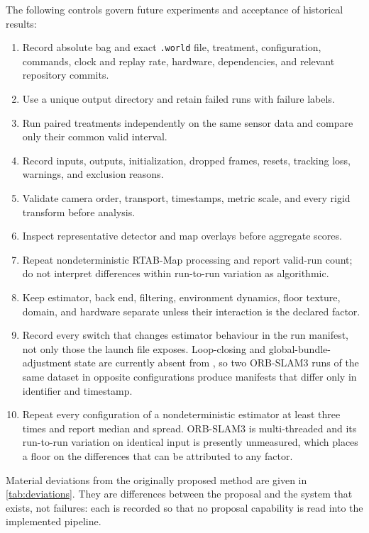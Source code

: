 The following controls govern future experiments and acceptance of historical
results:
\begin{enumerate}
  \item Record absolute bag and exact \texttt{.world} file, treatment,
    configuration, commands, clock and replay rate, hardware, dependencies, and
    relevant repository commits.
  \item Use a unique output directory and retain failed runs with failure labels.
  \item Run paired treatments independently on the same sensor data and compare
    only their common valid interval.
  \item Record inputs, outputs, initialization, dropped frames, resets, tracking
    loss, warnings, and exclusion reasons.
  \item Validate camera order, transport, timestamps, metric scale, and every
    rigid transform before analysis.
  \item Inspect representative detector and map overlays before aggregate scores.
  \item Repeat nondeterministic RTAB-Map processing and report valid-run count;
    do not interpret differences within run-to-run variation as algorithmic.
  \item Keep estimator, back end, filtering, environment dynamics, floor texture,
    domain, and hardware separate unless their interaction is the declared factor.
  \item Record every switch that changes estimator behaviour in the run manifest,
    not only those the launch file exposes. Loop-closing and global-bundle-adjustment
    state are currently absent from , so two ORB-SLAM3 runs
    of the same dataset in opposite configurations produce manifests that differ
    only in identifier and timestamp.
  \item Repeat every configuration of a nondeterministic estimator at least three
    times and report median and spread. ORB-SLAM3 is multi-threaded and its
    run-to-run variation on identical input is presently unmeasured, which places
    a floor on the differences that can be attributed to any factor.
\end{enumerate}

Material deviations from the originally proposed method are given in
\cref{tab:deviations}. They are differences between the proposal and the system
that exists, not failures: each is recorded so that no proposal capability is read
into the implemented pipeline.

